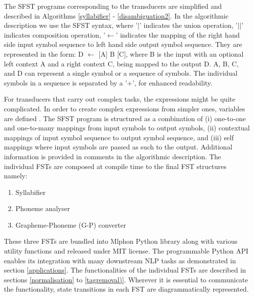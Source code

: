 \documentclass{ieeeaccess}
\begin{document}
The SFST programs corresponding to the transducers are simplified and described in Algorithms \ref{syllabifier} - \ref{disambiguation2}. In the algorithmic description we use the SFST syntax, where {\ipa '|'} indicates the union operation, {\ipa '||'} indicates composition operation, '$\leftarrow$' indicates the mapping of the right hand side input symbol sequence to left hand side output symbol sequence. They are represented in the form:  D $\leftarrow$ [A] B [C], where B is the input  with an optional left context A and a right context C, being mapped to the output D. A, B, C, and D can represent a single symbol or a sequence of symbols. The individual symbols in a sequence is separated by a {\ipa '+'}, for enhanced readability. 

For transducers that carry out complex tasks, the expressions might be quite complicated. In order to create complex expressions from simpler ones, variables are defined \cite{schmid2005sfst}. The SFST program is structured as a combination of  (i) one-to-one and one-to-many mappings from input symbols to output symbols, (ii) contextual mappings of input symbol sequence to output symbol sequence,  and (iii) self mappings where input symbols are passed as such to the output.  Additional information is provided in comments in the algorithmic description. 
The individual FSTs are composed at compile time to the final FST structures namely:
 
\begin{enumerate}
    \item Syllabifier
	\item Phoneme analyser
	\item Grapheme-Phoneme (G-P) converter
\end{enumerate}

These three FSTs are bundled into Mlphon Python library along with various utility functions and released under MIT license. The programmable Python API enables its integration with many downstream NLP tasks as demonstrated in section \ref{applications}. The functionalities of the individual FSTs are described in sections \ref{normalisation} to \ref{tagremoval)}. Wherever it is essential to communicate the functionality, state transitions in each FST are diagrammatically represented.


\end{document}
